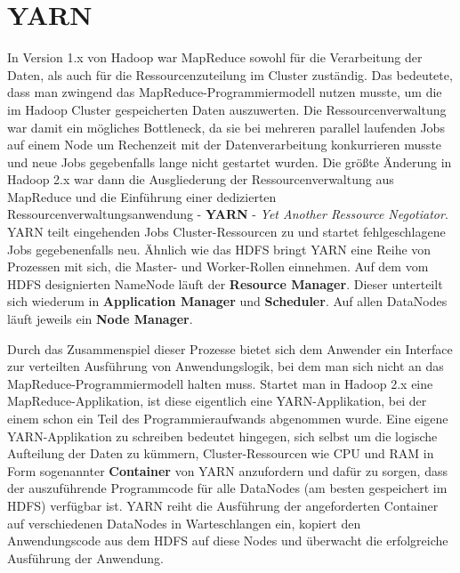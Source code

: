 \section{YARN}
\label{chap:fund sec:core sub:yarn}
In Version 1.x von Hadoop war MapReduce sowohl für die Verarbeitung der Daten, als auch für die Ressourcenzuteilung im Cluster zuständig. Das bedeutete, dass man zwingend das MapReduce-Programmiermodell nutzen musste, um die im Hadoop Cluster gespeicherten Daten auszuwerten. Die Ressourcenverwaltung war damit ein mögliches Bottleneck, da sie bei mehreren parallel laufenden Jobs auf einem Node um Rechenzeit mit der Datenverarbeitung konkurrieren musste und neue Jobs gegebenfalls lange nicht gestartet wurden.\cite{freiknecht_big_2018}
Die größte Änderung in Hadoop 2.x war dann die Ausgliederung der Ressourcenverwaltung aus MapReduce und die Einführung einer dedizierten Ressourcenverwaltungsanwendung - \textbf{YARN} - \textit{Yet Another Ressource Negotiator}. YARN teilt eingehenden Jobs Cluster-Ressourcen zu und startet fehlgeschlagene Jobs gegebenenfalls neu. Ähnlich wie das HDFS bringt YARN eine Reihe von Prozessen mit sich, die Master- und Worker-Rollen einnehmen. Auf dem vom HDFS designierten NameNode läuft der \textbf{Resource Manager}. Dieser unterteilt sich wiederum in \textbf{Application Manager} und \textbf{Scheduler}. Auf allen DataNodes läuft jeweils ein \textbf{Node Manager}.\cite{freiknecht_big_2018} 
\par
Durch das Zusammenspiel dieser Prozesse bietet sich dem Anwender ein Interface zur verteilten Ausführung von Anwendungslogik, bei dem man sich nicht an das MapReduce-Programmiermodell halten muss. Startet man in Hadoop 2.x eine MapReduce-Applikation, ist diese eigentlich eine YARN-Applikation, bei der einem schon ein Teil des Programmieraufwands abgenommen wurde. Eine eigene YARN-Applikation zu schreiben bedeutet hingegen, sich selbst um die logische Aufteilung der Daten zu kümmern, Cluster-Ressourcen wie CPU und RAM in Form sogenannter \textbf{Container} von YARN anzufordern und dafür zu sorgen, dass der auszuführende Programmcode für alle DataNodes (am besten gespeichert im HDFS) verfügbar ist. YARN reiht die Ausführung der angeforderten Container auf verschiedenen DataNodes in Warteschlangen ein, kopiert den Anwendungscode aus dem HDFS auf diese Nodes und überwacht die erfolgreiche Ausführung der Anwendung. 